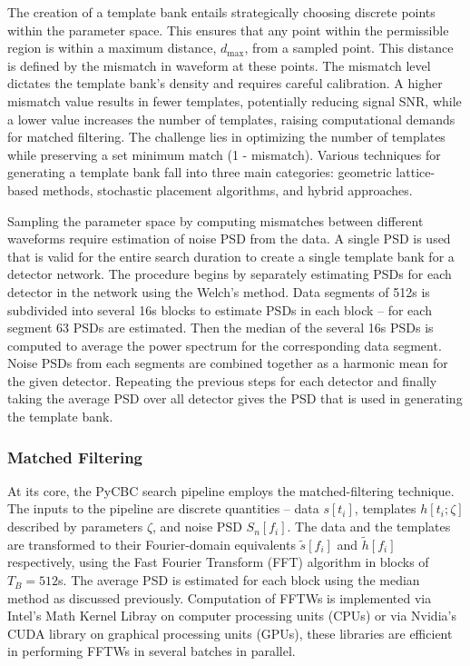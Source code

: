 The creation of a template bank entails strategically choosing discrete points within the parameter space. This ensures that any point within the permissible region is within a maximum distance, $ d_{\text{max}} $, from a sampled point. This distance is defined by the mismatch in waveform at these points. The mismatch level dictates the template bank's density and requires careful calibration. A higher mismatch value results in fewer templates, potentially reducing signal SNR, while a lower value increases the number of templates, raising computational demands for matched filtering. The challenge lies in optimizing the number of templates while preserving a set minimum match (1 - mismatch). Various techniques for generating a template bank fall into three main categories: geometric lattice-based methods, stochastic placement algorithms, and hybrid approaches.

Sampling the parameter space by computing mismatches between different waveforms require estimation of noise PSD from the data. A single PSD is used that is valid for the entire search duration to create a single template bank for a detector network. The procedure begins by separately estimating PSDs for each detector in the network using the Welch's method. Data segments of 512s is subdivided into several 16s blocks to estimate PSDs in each block -- for each segment 63 PSDs are estimated. Then the median of the several 16s PSDs is computed to average the power spectrum for the corresponding data segment. Noise PSDs from each segments are combined together as a harmonic mean for the given detector. Repeating the previous steps for each detector and finally taking the average PSD over all detector gives the PSD that is used in generating the template bank. 


\subsubsection{Matched Filtering}
At its core, the PyCBC search pipeline employs the matched-filtering technique. The inputs to the pipeline are discrete quantities -- data $s[t_i]$, templates $h[t_i; \zeta]$ described by parameters $\zeta$, and noise PSD $S_n[f_i]$. The data and the templates are transformed to their Fourier-domain equivalents $\tilde{s}[f_i]$ and $\tilde{h}[f_i]$ respectively, using the Fast Fourier Transform (FFT) algorithm in blocks of $T_B = 512$s. The average PSD is estimated for each block using the median method as discussed previously. Computation of FFTWs is implemented via Intel's Math Kernel Libray on computer processing units (CPUs) or via Nvidia's CUDA library on graphical processing units (GPUs), these libraries are efficient in performing FFTWs in several batches in parallel.  



